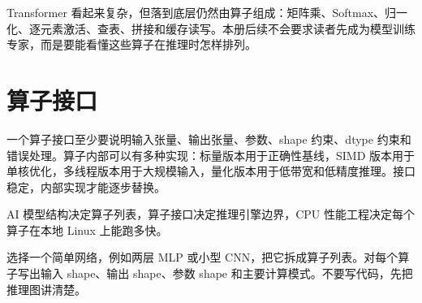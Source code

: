 Transformer 看起来复杂，但落到底层仍然由算子组成：矩阵乘、Softmax、归一化、逐元素激活、查表、拼接和缓存读写。本册后续不会要求读者先成为模型训练专家，而是要能看懂这些算子在推理时怎样排列。

\section{算子接口}

一个算子接口至少要说明输入张量、输出张量、参数、shape 约束、dtype 约束和错误处理。算子内部可以有多种实现：标量版本用于正确性基线，SIMD 版本用于单核优化，多线程版本用于大规模输入，量化版本用于低带宽和低精度推理。接口稳定，内部实现才能逐步替换。

\begin{keyidea}
AI 模型结构决定算子列表，算子接口决定推理引擎边界，CPU 性能工程决定每个算子在本地 Linux 上能跑多快。
\end{keyidea}

\begin{exercisebox}
选择一个简单网络，例如两层 MLP 或小型 CNN，把它拆成算子列表。对每个算子写出输入 shape、输出 shape、参数 shape 和主要计算模式。不要写代码，先把推理图讲清楚。
\end{exercisebox}

